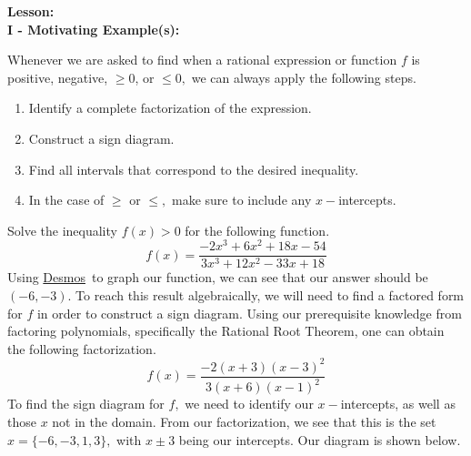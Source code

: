 \documentclass[12pt]{article}
\theoremstyle{definition}
\newcommand{\Desmos}{\href{https://www.desmos.com/}{Desmos}}
\begin{document}
{\bf Lesson:}\\
{\bf I - Motivating Example(s):}\\
\par
Whenever we are asked to find when a rational expression or function $f$ is positive, negative, $\geq 0$, or $\leq 0,$ we can always apply the following steps.
\begin{enumerate}
	\item Identify a complete factorization of the expression.
	\item Construct a sign diagram.
	\item Find all intervals that correspond to the desired inequality.
	\item In the case of $\geq$ or $\leq,$ make sure to include any $x-$intercepts.
\end{enumerate}
Solve the inequality $f(x)>0$ for the following function.
$$f(x)=\dfrac{-2x^3+6x^2+18x-54}{3x^3+12x^2-33x+18}$$
Using \Desmos \ to graph our function, we can see that our answer should be $(-6,-3)$.  To reach this result algebraically, we will need to find a factored form for $f$ in order to construct a sign diagram.  Using our prerequisite knowledge from factoring polynomials, specifically the Rational Root Theorem, one can obtain the following factorization.
$$f(x)=\frac{-2(x+3)(x-3)^2}{3(x+6)(x-1)^2}$$
To find the sign diagram for $f,$ we need to identify our $x-$intercepts, as well as those $x$ not in the domain.  From our factorization, we see that this is the set $x=\{-6,-3,1,3\},$ with $x\pm3$ being our intercepts.
\newpage
Our diagram is shown below.
\begin{center}
\end{center}
\end{document}
